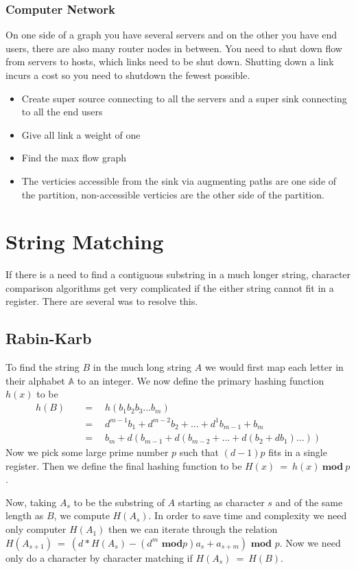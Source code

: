 \documentclass[a4paper]{article}
\begin{document}
\subsubsection{Computer Network}
On one side of a graph you have several servers and on the other you have end users, there are also many router nodes in between. You need to shut down flow from servers to hosts, which links need to be shut down. Shutting down a link incurs a cost so you need to shutdown the fewest possible.
\begin{itemize}
		\item Create super source connecting to all the servers and a super sink connecting to all the end users
		\item Give all link a weight of one
		\item Find the max flow graph
		\item The verticies accessible from the sink via augmenting paths are one side of the partition, non-accessible verticies are the other side of the partition.
\end{itemize}

\section{String Matching}
If there is a need to find a contiguous substring in a much longer string, character comparison algorithms get very complicated if the either string cannot fit in a register. There are several was to resolve this.

\subsection{Rabin-Karb}
To find the string $B$ in the much long string $A$ we would first map each letter in their alphabet $\mathbb{A}$ to an integer. We now define the primary hashing function $h(x)$ to be 
\begin{align}
		h(B)\quad&=\quad h(b_1b_2b_3...b_m)\\
		&=\quad d^{m-1}b_1 + d^{m-2}b_2 + ... + d^1b_{m-1} + b_m\\
		&=\quad b_m + d(b_{m-1} + d(b_{m-2} + ... + d(b_2 + db_1)...))
\end{align}
Now we pick some large prime number $p$ such that $(d-1)p$ fits in a single register. Then we define the final hashing function to be $H(x)\ =\ h(x)\ \textbf{mod}\ p$.

Now, taking $A_s$ to be the substring of $A$ starting as character $s$ and of the same length as $B$, we compute $H(A_s)$. In order to save time and complexity we need only computer $H(A_1)$ then we can iterate through the relation $H(A_{s+1})\ =\ (d * H(A_s) - (d^m 
\textbf{ mod}p)a_s + a_{s+m})\textbf{ mod }p$. Now we need only do a character by character matching if $H(A_s)\ =\ H(B)$.  
\end{document}
